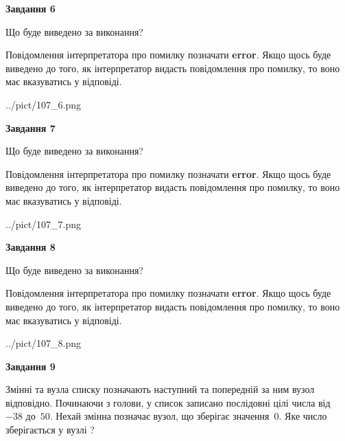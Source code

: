 \documentclass[12pt, ukrainian]{article}
\begin{document}
{\begin {large}
{\begin {center}\textbf{Завдання 6}\end {center}}\par
Що буде виведено за виконання?

Повідомлення інтерпретатора про помилку позначати \textbf{error}.
Якщо щось буде виведено до того, як інтерпретатор видасть повідомлення про помилку, 
то воно має вказуватись у відповіді. \par


\begin{center}
	{../pict/107_6.png}
\end{center}
\newpage

{\begin {center}\textbf{Завдання 7}\end {center}}\par
Що буде виведено за виконання?

Повідомлення інтерпретатора про помилку позначати \textbf{error}.
Якщо щось буде виведено до того, як інтерпретатор видасть повідомлення про помилку, 
то воно має вказуватись у відповіді. \par


\begin{center}
	{../pict/107_7.png}
\end{center}
\newpage

{\begin {center}\textbf{Завдання 8}\end {center}}\par
Що буде виведено за виконання?

Повідомлення інтерпретатора про помилку позначати \textbf{error}.
Якщо щось буде виведено до того, як інтерпретатор видасть повідомлення про помилку, 
то воно має вказуватись у відповіді. \par


\begin{center}
	{../pict/107_8.png}
\end{center}
\newpage

{\begin {center}\textbf{Завдання 9}\end {center}}\par
Змінні  та  вузла списку позначають наступний та попередній за ним вузол відповідно. Починаючи з голови, у список записано послідовні цілі числа від~$-38$ до~$50$. Нехай змінна  позначає вузол, що зберігає значення~$0$.
Яке число зберігається у вузлі  ?\par
\newpage


\end{large}}
\end{document}
